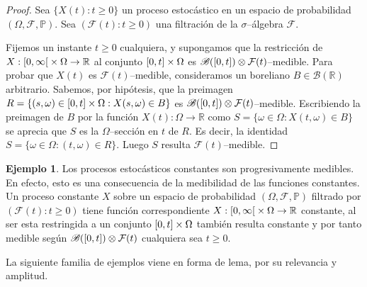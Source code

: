 \documentclass{report}
\newcommand{\leftOpenInterval}{\left]}
\newcommand{\rightOpenInterval}{\right[}
\newcommand{\leftClosedInterval}{\left[}
\newcommand{\rightClosedInterval}{\right]}
\newcommand{\interval}[3]{%
    \ifstrequal{#1}{oo}{%
      \leftOpenInterval #2, #3 \rightOpenInterval%
    }{%
      \ifstrequal{#1}{co}{%
        \leftClosedInterval #2, #3 \rightOpenInterval%
      }{%
        \ifstrequal{#1}{oc}{
          \leftOpenInterval #2, #3 \rightClosedInterval%
        }{%
          \ifstrequal{#1}{cc}{
            \leftClosedInterval #2, #3 \rightClosedInterval
          }{%
          }%
        }%
      }%
    }%
  }
\newcommand{\prob}{\mathbb{P}}
\newcommand{\events}{\mathcal{F}}
\newcommand{\borel}{\mathscr{B}}
\newcommand{\realNumbers}{\mathbb{R}}
\theoremstyle{plain}
\theoremstyle{remark}
\theoremstyle{definition}
\newtheorem{example}{Ejemplo}
\begin{document}

\begin{proof}
  Sea \(\{X(t) : t \geq 0\}\) un proceso estocástico en un espacio de probabilidad \((\Omega, \events, \prob)\).
  Sea \((\events(t) : t \geq 0)\) una filtración de la \(\sigma\)--álgebra \(\events\).

  Fijemos un instante \(t \geq 0\) cualquiera, y supongamos que la restricción de \(X : \interval{co}{0}{\infty} \times \Omega \rightarrow \realNumbers\) al conjunto \(\interval{cc}{0}{t} \times \Omega\) es \(\borel(\interval{cc}{0}{t}) \otimes \events(t)\)--medible.
  Para probar que \(X(t)\) es \(\events(t)\)--medible, consideramos un boreliano \(B \in \borel(\realNumbers)\) arbitrario.
  Sabemos, por hipótesis, que la preimagen \(R = \{(s, \omega) \in \interval{cc}{0}{t} \times \Omega : X(s, \omega) \in B\}\) es \(\borel(\interval{cc}{0}{t}) \otimes \events(t)\)--medible.
  Escribiendo la preimagen de \(B\) por la función  \(X(t) : \Omega \rightarrow \realNumbers\) como \(S = \{\omega \in \Omega : X(t, \omega) \in B\}\) se aprecia que \(S\) es la \(\Omega\)--sección en \(t\) de \(R\).
  Es decir, la identidad \(S = \{\omega \in \Omega : (t, \omega) \in R\}\).
  Luego \(S\) resulta \(\events(t)\)--medible.
\end{proof}

\begin{example}
  Los procesos estocásticos constantes son progresivamente medibles.
  En efecto, esto es una consecuencia de la medibilidad de las funciones constantes.
  Un proceso constante \(X\) sobre un espacio de probabilidad \((\Omega, \events, \prob)\) filtrado por \((\events(t) : t \geq 0)\) tiene función correspondiente \(X : \interval{co}{0}{\infty} \times \Omega \rightarrow \realNumbers\) constante, al ser esta restringida a un conjunto \(\interval{cc}{0}{t} \times \Omega\) también resulta constante y por tanto medible según \(\borel(\interval{cc}{0}{t}) \otimes \events(t)\) cualquiera sea \(t \geq 0\).
\end{example}

La siguiente familia de ejemplos viene en forma de lema, por su relevancia y amplitud.
\end{document}
